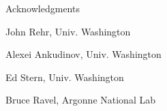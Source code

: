 \begin{slide}{Acknowledgments}
  \vmm
   
    John Rehr,  Univ. Washington

    \vmm

    Alexei Ankudinov,  Univ. Washington

    \vmm

    Ed Stern,  Univ. Washington

    \vmm

    Bruce Ravel, Argonne National Lab

\vfill
\end{slide} 
